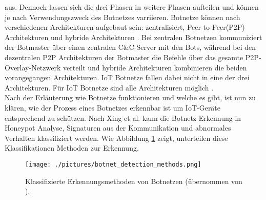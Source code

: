 aus. Dennoch lassen sich die drei Phasen in weitere Phasen aufteilen und können je nach Verwendungszweck des Botnetzes varriieren. Botnetze können nach verschiedenen Architekturen aufgebaut sein: 
zentralisiert, Peer-to-Peer(P2P) Architekturen \cite{DBLP:journals/fi/VuSEBD21} und hybride Architekturen \cite{DBLP:conf/ecai2/ApostolTP22}. Bei zentralen Botnetzen kommuniziert der Botmaster
über einen zentralen C\&C-Server mit den Bots, während bei den dezentralen P2P Architekturen der Botmaster die Befehle über das gesamte P2P-Overlay-Netzwerk verteilt und hybride Architekturen kombinieren 
die beiden vorangegangen Architekturen. IoT Botnetze fallen dabei nicht in eine der drei Architekturen. Für IoT Botnetze sind alle Architekturen möglich \cite{DBLP:conf/csndsp/McNultyV22}. \\ Nach der Erläuterung 
wie Botnetze funktionieren und welche es gibt, ist nun zu klären, wie der Prozess eines Botnetzes erkennbar ist um IoT-Geräte entsprechend zu schützen. Nach Xing et al. \cite{Xing2021SurveyOB} kann die Botnetz 
Erkennung in Honeypot Analyse, Signaturen aus der Kommunikation und abnormales Verhalten klassifiziert werden. Wie Abbildung \ref{fig:bot_det_met} zeigt, unterteilen diese Klassifikationen Methoden zur Erkennung. 

\begin{figure}[h!]
    \centering
    \texttt{[image: ./pictures/botnet\_detection\_methods.png]}
    \caption{Klassifizierte Erkennungsmethoden von Botnetzen (übernommen von \cite{Xing2021SurveyOB}).}
    \label{fig:bot_det_met}
\end{figure}

